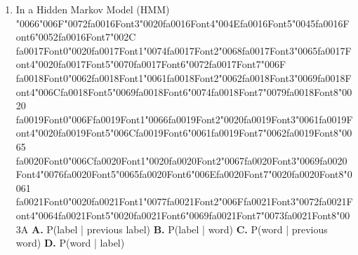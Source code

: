 \documentclass[11pt]{article}
\begin{document}
\begin{enumerate}[leftmargin=*]
  \item In a Hidden Markov Model (HMM) {\char"0066}{\char"006F}{\char"0072}{\csname fa0016Font3\endcsname\char"0020}{\csname fa0016Font4\endcsname\char"004E}{\csname fa0016Font5\endcsname\char"0045}{\csname fa0016Font6\endcsname\char"0052}{\csname fa0016Font7\endcsname\char"002C} {\csname fa0017Font0\endcsname\char"0020}{\csname fa0017Font1\endcsname\char"0074}{\csname fa0017Font2\endcsname\char"0068}{\csname fa0017Font3\endcsname\char"0065}{\csname fa0017Font4\endcsname\char"0020}{\csname fa0017Font5\endcsname\char"0070}{\csname fa0017Font6\endcsname\char"0072}{\csname fa0017Font7\endcsname\char"006F} {\csname fa0018Font0\endcsname\char"0062}{\csname fa0018Font1\endcsname\char"0061}{\csname fa0018Font2\endcsname\char"0062}{\csname fa0018Font3\endcsname\char"0069}{\csname fa0018Font4\endcsname\char"006C}{\csname fa0018Font5\endcsname\char"0069}{\csname fa0018Font6\endcsname\char"0074}{\csname fa0018Font7\endcsname\char"0079}{\csname fa0018Font8\endcsname\char"0020} {\csname fa0019Font0\endcsname\char"006F}{\csname fa0019Font1\endcsname\char"0066}{\csname fa0019Font2\endcsname\char"0020}{\csname fa0019Font3\endcsname\char"0061}{\csname fa0019Font4\endcsname\char"0020}{\csname fa0019Font5\endcsname\char"006C}{\csname fa0019Font6\endcsname\char"0061}{\csname fa0019Font7\endcsname\char"0062}{\csname fa0019Font8\endcsname\char"0065} {\csname fa0020Font0\endcsname\char"006C}{\csname fa0020Font1\endcsname\char"0020}{\csname fa0020Font2\endcsname\char"0067}{\csname fa0020Font3\endcsname\char"0069}{\csname fa0020Font4\endcsname\char"0076}{\csname fa0020Font5\endcsname\char"0065}{\csname fa0020Font6\endcsname\char"006E}{\csname fa0020Font7\endcsname\char"0020}{\csname fa0020Font8\endcsname\char"0061} {\csname fa0021Font0\endcsname\char"0020}{\csname fa0021Font1\endcsname\char"0077}{\csname fa0021Font2\endcsname\char"006F}{\csname fa0021Font3\endcsname\char"0072}{\csname fa0021Font4\endcsname\char"0064}{\csname fa0021Font5\endcsname\char"0020}{\csname fa0021Font6\endcsname\char"0069}{\csname fa0021Font7\endcsname\char"0073}{\csname fa0021Font8\endcsname\char"003A}
    \textbf{A.} P(label | previous label)
    \textbf{B.} P(label | word)
    \textbf{C.} P(word | previous word)
    \textbf{D.} P(word | label)


\end{enumerate}
\end{document}

